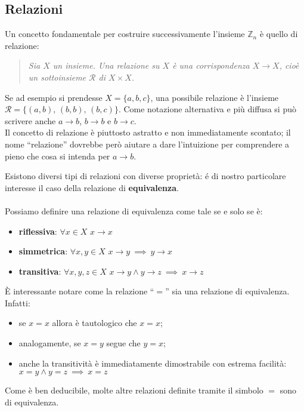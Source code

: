\documentclass[a4paper,12pt]{article}
\begin{document}
\subsection{Relazioni}\label{Relazi}
\noindent Un concetto fondamentale per costruire successivamente l'insieme $\mathbb{Z}_n$ è quello di relazione:
\begin{quote}
    \emph{Sia $X$ un insieme. Una relazione su $X$ è una corrispondenza $X\to X$, cioè un sottoinsieme $\mathcal{R}$ di $X\times X$.}
\end{quote}

 \noindent Se ad esempio si prendesse $X=\{a,b,c\}$, una possibile relazione è l'insieme $\mathcal{R}=\{(a,b),\, (b,b),\,(b,c)\}$. Come notazione alternativa e più diffusa si può scrivere anche $a \to b$, $b \to b$ e $b \to c$.\\

\noindent Il concetto di relazione è piuttosto astratto e non immediatamente scontato; il nome ``relazione'' dovrebbe però aiutare a dare l'intuizione per comprendere a pieno che cosa si intenda per $a \to b$.

\noindent Esistono diversi tipi di relazioni con diverse proprietà: \'e di nostro particolare interesse il caso della relazione di \textbf{equivalenza}.\\
\\Possiamo definire una relazione di equivalenza come tale se e solo se è:
\begin{itemize}
\item \textbf{riflessiva}: $\forall x\in X$ $x \to x$
\item \textbf{simmetrica}: $\forall x,y\in X$ $x \to y \ \implies \ y \to x$
\item \textbf{transitiva}: $\forall x,y,z\in X$ $x \to y \land y \to z \ \implies \ x \to z$
\end{itemize}
È interessante notare come la relazione ``$=$'' sia una relazione di equivalenza. Infatti:
\begin{itemize}
    \item se $x=x$ allora è tautologico che $x=x$;
    \item analogamente, se $x=y$ segue che $y=x$;
    \item anche la transitività è immediatamente dimostrabile con estrema facilità: $x=y \land y=z \ \implies \ x = z$
\end{itemize}
Come è ben deducibile, molte altre relazioni definite tramite il simbolo $=$ sono di equivalenza.
\end{document}
